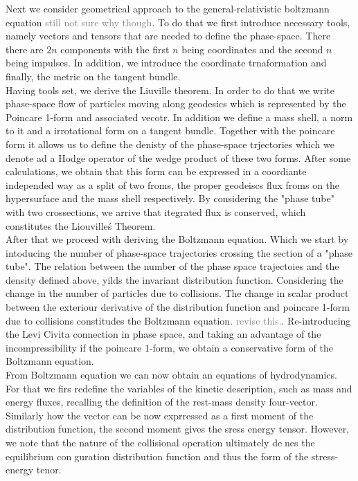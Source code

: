 \documentclass[11pt,a4paper,headinclude=true,DIV=14,BCOR=8mm,chapterprefix,listof=totoc,twoside,openright,abstracton]{scrbook}
\begin{document}
Next we consider geometrical approach to the general-relativistic boltzmann equation \textcolor{gray}{still not sure why though}. To do that we first introduce necessary tools, namely vectors and tensors that are needed to define the phase-space. There there are $2n$ components with the first $n$ being coordinates and the second $n$ being impulses. In addition, we introduce the coordinate trnaformation and finally, the metric on the tangent bundle. \\

Having tools set, we derive the Liuville theorem. In order to do that we write phase-space flow of particles moving along geodesics which is represented by the Poincare 1-form and associated vecotr. In addition we define a mass shell, a norm to it and a irrotational form on a tangent bundle. Together with the poincare form it allows us to define the denisty of the phase-space trjectories which we denote ad a Hodge operator of the wedge product of these two forms. After some calculations, we obtain that this form can be expressed in a coordiante independed way as a split of two froms, the proper geodeiscs flux froms on the hypersurface and the mass shell respectively. By considering the "phase tube" with two crossections, we arrive that itegrated flux is conserved, which constitutes the Liouville\'s Theorem. \\

After that we proceed with deriving the Boltzmann equation. Which we start by intoducing the number of phase-space trajectories crossing the section of a "phase tube". The relation between the number of the phase space trajectoies and the density defined above, yilds the invariant distribution function. Considering the change in the number of particles due to collisions. The change in scalar product between the exteriour derivative of the distribution function and poincare 1-form due to collisions constitudes the Boltzmann equation. \textcolor{gray}{revise this.}. Re-introducing the Levi Civita connection in phase space, and taking an advantage of the incompressibility if the poincare 1-form, we obtain a conservative form of the Boltzmann equation. \\

From Boltzmann equation we can now obtain an equations of hydrodynamics. For that we firs redefine the variables of the kinetic description, such as mass and energy fluxes, recalling the definition of the rest-mass density four-vector. Similarly how the vector can be now exprressed as a first moment of the distribution function, the second moment gives the sress energy tensor. However, we note that the nature of the collisional operation ultimately denes the equilibrium conguration distribution function and thus the form of the stress-energy tenor. \\
\end{document}
